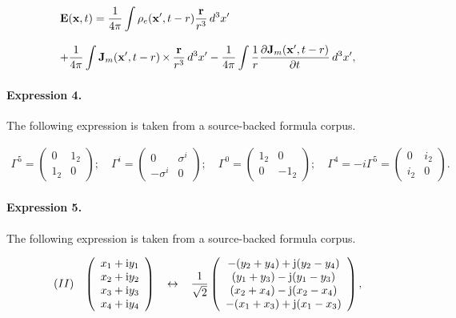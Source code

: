 \documentclass[11pt]{article}
\begin{document}
\begin{align*}\begin{array}{l}\mathbf{E}(\mathbf{x},t) =\displaystyle\frac{1}{4\pi}\int\rho_e(\mathbf{x}',t-r)\frac{\mathbf{r}}{r^3}\,d^3x'\\~\\+\displaystyle\frac{1}{4\pi}\int\mathbf{J}_m(\mathbf{x}',t-r)\,{\bf\times}\,\frac{\mathbf{r}}{r^3}\,d^3x'-\displaystyle\frac{1}{4\pi}\int\frac{1}{r}\frac{\partial\mathbf{J}_m(\mathbf{x}',t-r)}{\partial t}\,d^3x' ,\end{array}\end{align*}

\paragraph{Expression 4.} The following expression is taken from a source-backed formula corpus.

\begin{align*}\Gamma ^{5}=\left( \begin{array}{cc}0 & 1_{2} \\ 1_{2} & 0\end{array}\right);\quad \Gamma ^{i}=\left( \begin{array}{cc}0 & \sigma ^{i} \\ -\sigma ^{i} & 0\end{array}\right);\quad \Gamma ^{0}=\left( \begin{array}{cc}1_{2} & 0 \\ 0 & -1_{2}\end{array}\right);\quad \Gamma ^{4}=-i\Gamma ^{5}=\left( \begin{array}{cc}0 & i_{2} \\ i_{2} & 0\end{array}\right).\end{align*}

\paragraph{Expression 5.} The following expression is taken from a source-backed formula corpus.

\begin{align*}(II) \hspace{3mm} \left(\begin{array}{c}x_1+{\rm i}y_1 \\x_2+{\rm i}y_2 \\x_3+{\rm i}y_3 \\x_4+{\rm i}y_4\end{array}\right) \hspace{3mm} \leftrightarrow \hspace{3mm}\frac{1}{\sqrt{2}}\left(\begin{array}{c}-(y_2+y_4) +{\rm j}(y_2-y_4) \\(y_1 + y_3) -{\rm j}(y_1-y_3) \\(x_2 + x_4) -{\rm j}(x_2 - x_4) \\-(x_1 + x_3) +{\rm j}(x_1 - x_3)\end{array}\right),\end{align*}
\end{document}
